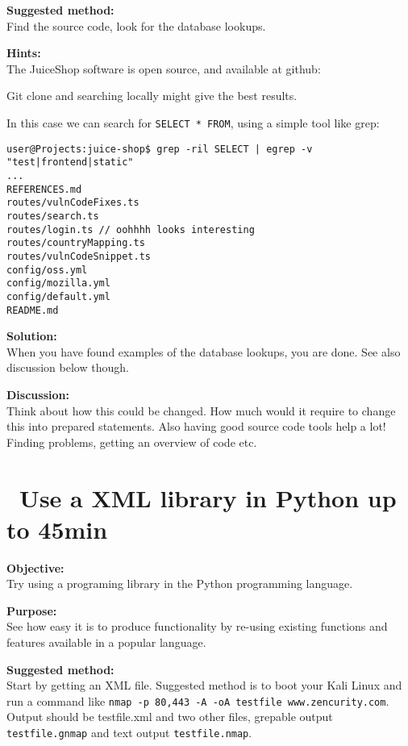 \documentclass[a4paper,11pt,notitlepage]{report}
\begin{document}
{\bf Suggested method:}\\
Find the source code, look for the database lookups.


{\bf Hints:}\\
The JuiceShop software is open source, and available at github:\\

Git clone and searching locally might give the best results.

In this case we can search for \verb+SELECT * FROM+, using a simple tool like grep:

\begin{verbatim}
user@Projects:juice-shop$ grep -ril SELECT | egrep -v "test|frontend|static"
...
REFERENCES.md
routes/vulnCodeFixes.ts
routes/search.ts
routes/login.ts // oohhhh looks interesting
routes/countryMapping.ts
routes/vulnCodeSnippet.ts
config/oss.yml
config/mozilla.yml
config/default.yml
README.md
\end{verbatim}


{\bf Solution:}\\
When you have found examples of the database lookups, you are done. See also discussion below though.


{\bf Discussion:}\\
Think about how this could be changed. How much would it require to change this into prepared statements.
Also having good source code tools help a lot! Finding problems, getting an overview of code etc.


\chapter{\faInfoCircle\ Use a XML library in Python up to 45min}
\label{ex-python-library}

{\bf Objective:}\\
Try using a programing library in the Python programming language.

{\bf Purpose:}\\
See how easy it is to produce functionality by re-using existing functions and features available in a popular language.

{\bf Suggested method:}\\
Start by getting an XML file. Suggested method is to boot your Kali Linux and run a command like \verb+nmap -p 80,443 -A -oA testfile www.zencurity.com+. Output should be testfile.xml and two other files, grepable output \verb+testfile.gnmap+ and text output \verb+testfile.nmap+.
\end{document}
